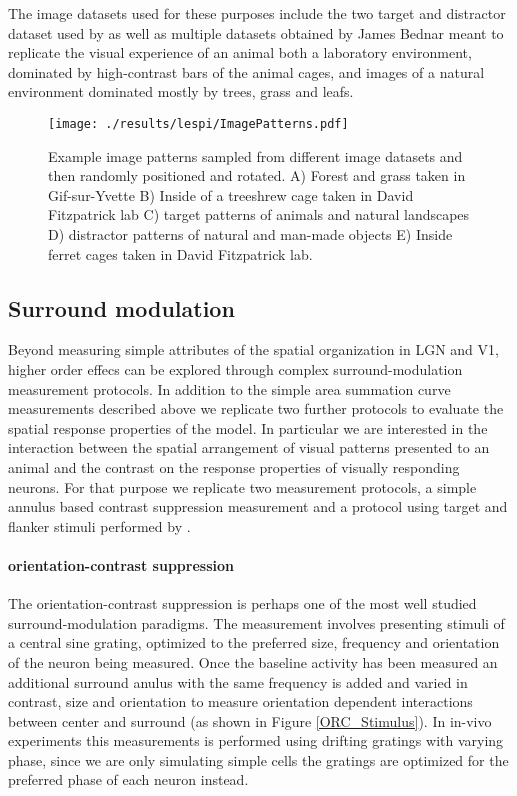 The image datasets used for these purposes include the two target and
distractor dataset used by \cite{Serre2007} as well as multiple
datasets obtained by James Bednar meant to replicate the visual
experience of an animal both a laboratory environment, dominated by
high-contrast bars of the animal cages, and images of a natural
environment dominated mostly by trees, grass and leafs.

\begin{figure}
	\centering
	\texttt{[image: ./results/lespi/ImagePatterns.pdf]}
	\caption[Example image patterns used to train the model] {Example
      image patterns sampled from different image datasets and then
      randomly positioned and rotated. A) Forest and grass taken in
      Gif-sur-Yvette B) Inside of a treeshrew cage taken in David
      Fitzpatrick lab C) \cite{Serre07} target patterns of animals and
      natural landscapes D) \cite{Serre07} distractor patterns of
      natural and man-made objects E) Inside ferret cages taken in
      David Fitzpatrick lab.}
    \label{image_patterns}
\end{figure}

\subsection{Surround modulation}

Beyond measuring simple attributes of the spatial organization in LGN
and V1, higher order effecs can be explored through complex 
surround-modulation measurement protocols. In addition to the simple area
summation curve measurements described above we replicate two further
protocols to evaluate the spatial response properties of the model.
In particular we are interested in the interaction between the spatial
arrangement of visual patterns presented to an animal and the contrast
on the response properties of visually responding neurons. For that
purpose we replicate two measurement protocols, a simple annulus based
contrast suppression measurement \cite{Jones2002} and a protocol using
target and flanker stimuli performed by \cite{Kapadia1995}.

\paragraph{orientation-contrast suppression}

The orientation-contrast suppression is perhaps one of the most well
studied surround-modulation paradigms. The measurement involves
presenting stimuli of a central sine grating, optimized to the
preferred size, frequency and orientation of the neuron being
measured. Once the baseline activity has been measured an additional
surround anulus with the same frequency is added and varied in
contrast, size and orientation to measure orientation dependent
interactions between center and surround (as shown in Figure
\ref{ORC_Stimulus}). In in-vivo experiments this measurements is
performed using drifting gratings with varying phase, since we are
only simulating simple cells the gratings are optimized for the
preferred phase of each neuron instead.


